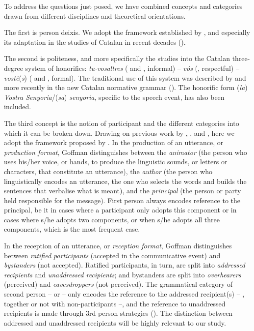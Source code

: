 \documentclass[output=paper]{langscibook}
\begin{document}
To address the questions just posed, we have combined concepts and categories drawn from different disciplines and theoretical orientations.



The first is person deixis. We adopt the framework established by \citet{Levinson1983}, and especially its adaptation in the studies of Catalan in recent decades (\citealt{Payrató2002, Cuenca2004, Cuenca2014, Nogué2005,Nogué2008a,Nogué2008b, Nogué2011, Nogué2015, DeCockNogué2017}).



The second is politeness, and more specifically the studies into the Catalan three-degree system of honorifics: \textit{tu-vosaltres} ( and , informal) – \textit{vós} (, respectful) – \textit{vostè}(\textit{s}) ( and , formal). The traditional use of this system was described by \citet{Coromines1971} and more recently in the new Catalan normative grammar (\citealt{GIEC2016}). The honorific form (\textit{la}) \textit{Vostra Senyoria}\slash(\textit{sa}) \textit{senyoria}, specific to the speech event, has also been included.



The third concept is the notion of participant and the different categories into which it can be broken down. Drawing on previous work by \citet{Bühler1934}, \citet{Jakobson1960}, and \citet{Hymes1974}, here we adopt the framework proposed by \citet{Goffman1981}. In the production of an utterance, or \textit{production format}, Goffman distinguishes between the \textit{animator} (the person who uses his/her voice, or hands, to produce the linguistic sounds, or letters or characters, that constitute an utterance), the \textit{author} (the person who linguistically encodes an utterance, the one who selects the words and builds the sentences that verbalise what is meant), and the \textit{principal} (the person or party held responsible for the message). First person always encodes reference to the principal, be it in cases where a participant only adopts this component or in cases where s/he adopts two components, or when s/he adopts all three components, which is the most frequent case.



In the reception of an utterance, or \textit{reception format}, Goffman distinguishes between \textit{ratified participants} (accepted in the communicative event) and \textit{bystanders} (not accepted). Ratified participants, in turn, are split into \textit{addressed recipients} and \textit{unaddressed recipients}; and bystanders are split into \textit{overhearers} (perceived) and \textit{eavesdroppers} (not perceived). The grammatical category of second person –  or  – only encodes the reference to the addressed recipient(s) – , together or not with non-participants –, and the reference to unaddressed recipients is made through 3rd person strategies (\citealt{Nogué2005,Nogué2008a}). The distinction between addressed and unaddressed recipients will be highly relevant to our study.
\end{document}
